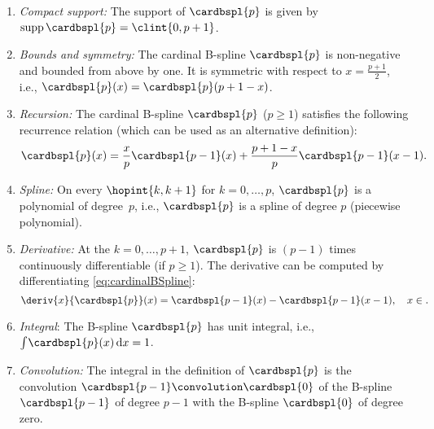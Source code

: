 \begin{enumerate}
  \item
  \emph{Compact support:}
  The support of $\cardbspl{p}$ is given by $\supp \cardbspl{p} = \clint{0, p + 1}$.
  
  \item
  \emph{Bounds and symmetry:}
  The cardinal B-spline $\cardbspl{p}$ is non-negative and bounded from above by one.
  It is symmetric with respect to $x = \tfrac{p+1}{2}$, i.e.,
  $\cardbspl{p}(x) = \cardbspl{p}(p + 1 - x)$.
  
  \item
  \emph{Recursion:}
  The cardinal B-spline $\cardbspl{p}$ ($p \ge 1$)
  satisfies the following recurrence relation
  (which can be used as an alternative definition):
  \begin{equation}
    \cardbspl{p}(x)
    = \frac{x}{p} \cardbspl{p-1}(x) + \frac{p+1-x}{p} \cardbspl{p-1}(x-1).
  \end{equation}
  
  \item
  \emph{Spline:}
  On every  $\hopint{k, k+1}$ for $k = 0, \dotsc, p$,
  $\cardbspl{p}$ is a polynomial of degree~$p$, i.e.,
  $\cardbspl{p}$ is a spline of degree $p$ (piecewise polynomial).
  
  \item
  \emph{Derivative:}
  At the  $k = 0, \dotsc, p + 1$,
  $\cardbspl{p}$ is $(p - 1)$ times continuously differentiable (if $p \ge 1$).
  The derivative can be computed by differentiating
  \eqref{eq:cardinalBSpline}:
  \begin{equation}
    \label{eq:cardinalBSplineDerivative}
    \deriv{x}{\cardbspl{p}}(x)
    = \cardbspl{p-1}(x) - \cardbspl{p-1}(x-1),\quad
    x \in \real.
  \end{equation}
  
  \item
  \emph{Integral}:
  The B-spline $\cardbspl{p}$ has unit integral, i.e.,
  $\int_{\real} \cardbspl{p}(x) \dx = 1$.
  
  \item
  \emph{Convolution:}
  The integral in the definition of $\cardbspl{p}$
  is the convolution $\cardbspl{p-1} \convolution \cardbspl{0}$
  of the B-spline $\cardbspl{p-1}$
  of degree $p - 1$ with the B-spline $\cardbspl{0}$ of degree zero.
  

\end{enumerate}

